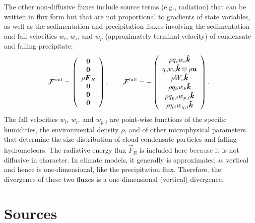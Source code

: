 \documentclass{report}
\begin{document}
The other non-diffusive fluxes include source terms (e.g., radiation) that can be written in flux form but that are not proportional to gradients of state variables, as well as the sedimentation and precipitation fluxes involving the sedimentation and fall velocities $w_l$, $w_i$, and $w_p$ (approximately terminal velocity) of condensate and falling precipitate:
\begin{equation}
\boldsymbol{{\mathcal{F}}}^{\mathrm{rad}} = 
\left( \begin{array}{c}
\boldsymbol{{0}} \\
\boldsymbol{{0}} \\
\rho \boldsymbol{{F}}_R \\
\boldsymbol{{0}} \\
\boldsymbol{{0}} \\
\boldsymbol{{0}} 
\end{array}
\right), \qquad
\boldsymbol{{\mathcal{F}}}^{\mathrm{fall}} = 
- \left( \begin{array}{c}
\rho q_{c} w_{c} \boldsymbol{{\hat k}}  \\
q_c w_c \boldsymbol{{\hat k}} \otimes \rho \boldsymbol{{u}}  \\
\rho W_c \boldsymbol{{\hat k}} \\
\rho q_{k} w_{k} \boldsymbol{{\hat k}}  \\
\rho q_{p,i} w_{p, i} \boldsymbol{{\hat k}} \\
\rho \chi_{i} w_{\chi, i} \boldsymbol{{\hat k}} 
\end{array}
\right).
\label{e:ndf_flux}
\end{equation}
The fall velocities $w_l$, $w_i$, and $w_{p, i}$ are point-wise functions of the specific humidities, the environmental density $\rho$, and of other microphysical parameters that determine the size distribution of cloud condensate particles and falling hydrometeors. The radiative energy flux $\vec{F}_R$ is included here because it is not diffusive in character. In climate models, it generally is approximated as vertical and hence is one-dimensional, like the precipitation flux. Therefore, the divergence of these two fluxes is a one-dimensional (vertical) divergence. 

\section{Sources}
\end{document}

